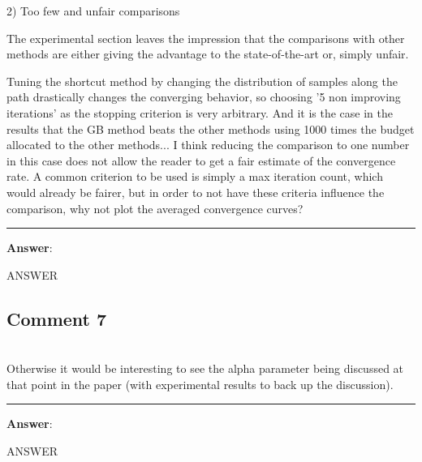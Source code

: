 \documentclass{scrartcl}
\begin{document}
2) Too few and unfair comparisons

The experimental section leaves the impression that the comparisons with other methods are either giving the advantage to the state-of-the-art or, simply unfair. 

Tuning the shortcut method by changing the distribution of samples along the path drastically changes the converging behavior, so choosing '5 non improving iterations' as the stopping criterion is very arbitrary. And it is the case in the results that the GB method beats the other methods using 1000 times the budget allocated to the other methods... I think reducing the comparison to one number in this case does not allow the reader to get a fair estimate of the convergence rate. A common criterion to be used is simply a max iteration count, which would already be fairer, but in order to not have these criteria influence the comparison, why not plot the averaged convergence curves?

\rule{\linewidth}{.1pt}
\textbf{Answer}:

ANSWER

\subsection{Comment 7}
\hrulefill\\

Otherwise it would be interesting to see the alpha parameter being discussed at that point in the paper (with experimental results to back up the discussion).

\rule{\linewidth}{.1pt}
\textbf{Answer}:

ANSWER
\end{document}
